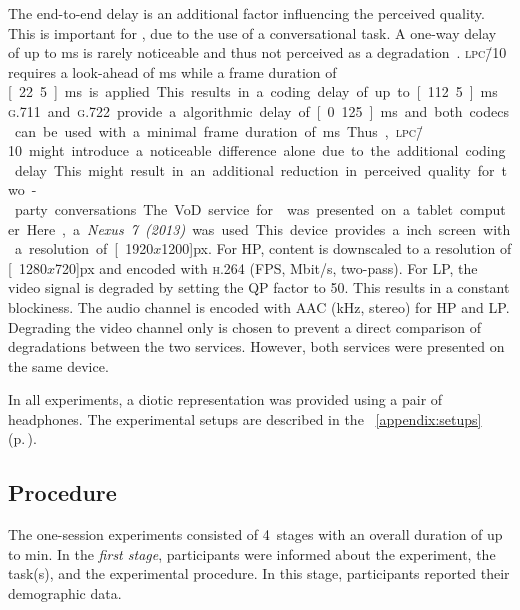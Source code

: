 The end-to-end delay is an additional factor influencing the perceived quality.
This is important for , due to the use of a conversational task.
A one-way delay of up to \unit[100]{ms} is rarely noticeable and thus not perceived as a degradation~\citep[][p.\,9]{itu-t_recommendation_g.107_e-model:_2015}.
\textsc{\lowercase{LPC\=/10}} requires a look-ahead of \unit[90]{ms} while a frame duration of \unit[22.5]{ms} is applied.
This results in a coding delay of up to \unit[112.5]{ms}.
\textsc{\lowercase{G.711}} and \textsc{\lowercase{G.722}} provide a algorithmic delay of \unit[0.125]{ms} and both codecs can be used with a minimal frame duration of \unit[10]{ms}.
Thus, \textsc{\lowercase{LPC\=/10}} might introduce a noticeable difference alone due to the additional coding delay.
This might result in an additional reduction in perceived quality for two-party conversations.

The \ac{VoD} service for \EIIb{} was presented on a tablet computer.
Here, a \emph{Nexus~7~(2013)} was used.
This device provides a \unit[7]{inch} screen with a resolution of \unit[1920$x$1200]{px}.
For \ac{HP}, content is downscaled to a resolution of \unit[1280$x$720]{px} and encoded with \textsc{\lowercase{H.264}} (\unit[25]{\acs{FPS}}, \unit[5]{Mbit/s}, two-pass).
For \ac{LP}, the video signal is degraded by setting the \acs{QP} factor to 50.
This results in a constant blockiness.
The audio channel is encoded with \acs{AAC} (\unit[48]{kHz}, stereo) for \ac{HP} and \ac{LP}.
Degrading the video channel only is chosen to prevent a direct comparison of degradations between the two services.
However, both services were presented on the same device.

In all experiments, a diotic representation was provided using a pair of headphones.
The experimental setups are described in the \appendix{}~\ref{appendix:setups} (p.\,\pageref{appendix:setups}).

\subsection{Procedure}\label{sec:training}
The one-session experiments consisted of 4~stages with an overall duration of up to \unit[90]{min}.
In the \emph{first stage}, participants were informed about the experiment, the task(s), and the experimental procedure.
In this stage, participants reported their demographic data.

